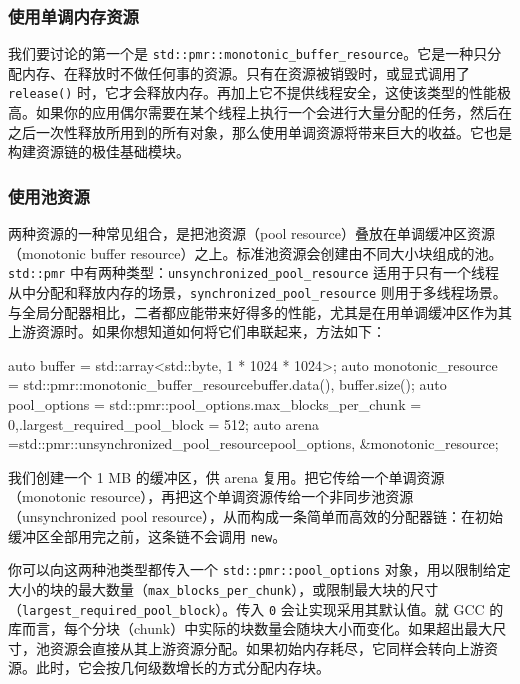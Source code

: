 \subsubsection{使用单调内存资源}

\label{idx:618}
我们要讨论的第一个是 \texttt{std::\allowbreak{}pmr::\allowbreak{}monotonic\_\allowbreak{}buffer\_\allowbreak{}resource}。它是一种只分配内存、在释放时不做任何事的资源。只有在资源被销毁时，或显式调用了 \texttt{release()} 时，它才会释放内存。再加上它不提供线程安全，这使该类型的性能极高。如果你的应用偶尔需要在某个线程上执行一个会进行大量分配的任务，然后在之后一次性释放所用到的所有对象，那么使用单调资源将带来巨大的收益。它也是构建资源链的极佳基础模块。

\subsubsection{使用池资源}

\label{idx:619}
两种资源的一种常见组合，是把池资源（pool resource）叠放在单调缓冲区资源（monotonic buffer resource）之上。标准池资源会创建由不同大小块组成的池。\texttt{std::pmr} 中有两种类型：\texttt{unsynchronized\_\allowbreak{}pool\_\allowbreak{}resource} 适用于只有一个线程从中分配和释放内存的场景，\texttt{synchronized\_\allowbreak{}pool\_\allowbreak{}resource} 则用于多线程场景。与全局分配器相比，二者都应能带来好得多的性能，尤其是在用单调缓冲区作为其上游资源时。如果你想知道如何将它们串联起来，方法如下：

\begin{codebox}[cpp]
auto buffer = std::array<std::byte, 1 * 1024 * 1024>{};
auto monotonic_resource = std::pmr::monotonic_buffer_resource{buffer.data(), buffer.size()};
auto pool_options = std::pmr::pool_options{.max_blocks_per_chunk = 0,.largest_required_pool_block = 512};
auto arena =std::pmr::unsynchronized_pool_resource{pool_options, &monotonic_resource};
\end{codebox}

我们创建一个 1 MB 的缓冲区，供 arena 复用。把它传给一个单调资源（monotonic resource），再把这个单调资源传给一个非同步池资源（unsynchronized pool resource），从而构成一条简单而高效的分配器链：在初始缓冲区全部用完之前，这条链不会调用 \texttt{new}。

\label{idx:620}
你可以向这两种池类型都传入一个 \texttt{std::\allowbreak{}pmr::\allowbreak{}pool\_\allowbreak{}options} 对象，用以限制给定大小的块的最大数量（\texttt{max\_\allowbreak{}blocks\_\allowbreak{}per\_\allowbreak{}chunk}），或限制最大块的尺寸（\texttt{largest\_\allowbreak{}required\_\allowbreak{}pool\_\allowbreak{}block}）。传入 \texttt{0} 会让实现采用其默认值。就 GCC 的库而言，每个分块（chunk）中实际的块数量会随块大小而变化。如果超出最大尺寸，池资源会直接从其上游资源分配。如果初始内存耗尽，它同样会转向上游资源。此时，它会按几何级数增长的方式分配内存块。

